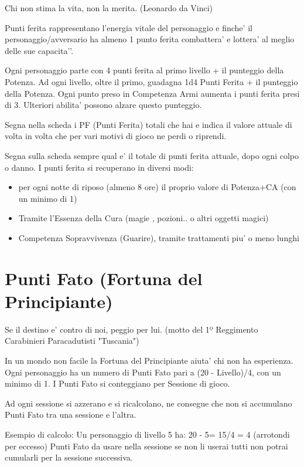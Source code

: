 \documentclass[a4paper,11pt,twoside,openany]{dndbook}
\begin{document}
\begin{quotebox}Chi non stima la vita, non la merita. (Leonardo da Vinci)
\end{quotebox}


Punti ferita rappresentano l’energia vitale del personaggio e finche’ il personaggio/avversario ha almeno 1 punto ferita combattera’ e lottera’ al meglio delle sue capacita'’.

Ogni personaggio parte con 4 punti ferita al primo livello + il punteggio della Potenza.
Ad ogni livello, oltre il primo, guadagna 1d4 Punti Ferita + il punteggio della Potenza. 
Ogni punto preso in Competenza Armi aumenta i punti ferita presi di 3. Ulteriori abilita’ possono alzare questo punteggio.

Segna nella scheda i PF (Punti Ferita) totali che hai e indica il valore attuale di volta in volta che per vari motivi di gioco ne perdi o riprendi.

Segna sulla scheda sempre qual e’ il totale di punti ferita attuale, dopo ogni colpo o danno.
I punti ferita si recuperano in diversi modi:

\begin{itemize}
\item 
per ogni notte di riposo (almeno 8 ore) il proprio valore di Potenza+CA (con un minimo di 1) 
\item
 Tramite l'Essenza della Cura (magie , pozioni.. o altri oggetti magici) 
\item 
Competenza Sopravvivenza (Guarire), tramite trattamenti piu' o meno lunghi 
\end{itemize}


\section{Punti Fato (Fortuna del Principiante)}
\begin{quotebox}Se il destino e' contro di noi, peggio per lui. (motto del 1º Reggimento Carabinieri Paracadutisti "Tuscania")
\end{quotebox}

In un mondo non facile la Fortuna del Principiante aiuta’ chi non ha esperienza.
Ogni personaggio ha un numero di Punti Fato pari a (20 - Livello)/4, con un minimo di 1. I Punti Fato si conteggiano per Sessione di gioco. 

Ad ogni sessione si azzerano e si ricalcolano, ne consegue che non si accumulano Punti Fato tra una sessione e l’altra.

Esempio di calcolo:
Un personaggio di livello 5 ha: 20 - 5= 15/4 = 4 (arrotondi per eccesso) Punti Fato da usare nella sessione se non li userai tutti non potrai cumularli per la sessione successiva.
\end{document}
